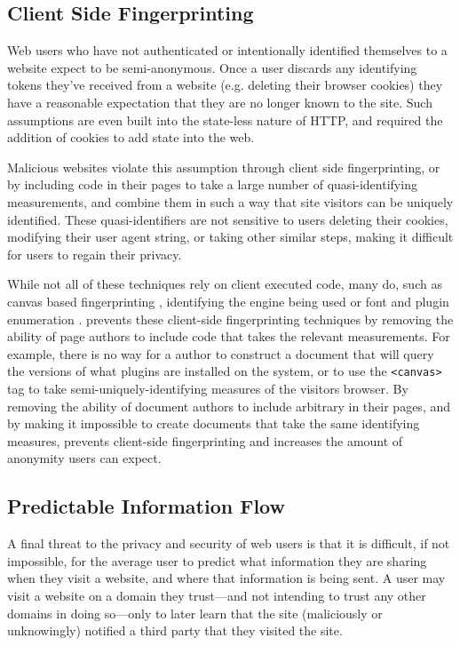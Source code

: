 \subsection{Client Side Fingerprinting}
Web users who have not authenticated or intentionally identified themselves to
a website expect to be semi-anonymous.  Once a user discards any identifying
tokens they've received from a website (e.g. deleting their browser cookies)
they have a reasonable expectation that they are no longer known to the site.
Such assumptions are even built into the state-less nature of HTTP, and
required the addition of cookies to add state into the web.

Malicious websites violate this assumption through client side
fingerprinting, or by including \JS code in their pages to
take a large number of quasi-identifying measurements, and combine them
in such a way that site visitors can be uniquely identified.  These
quasi-identifiers are not sensitive to users deleting their cookies,
modifying their user agent string, or taking other similar steps, making it
difficult for users to regain their privacy.

While not all of these techniques rely on client executed \JS
code, many do, such as canvas based fingerprinting
\cite{mowery2012pixel,acar2014web}, identifying the \JS
engine being used\cite{mowery2011fingerprinting} or font and plugin enumeration
\cite{eckersley2010unique}.  \CDF prevents these client-side fingerprinting
techniques by removing the ability of page authors to
include code that takes the relevant measurements.  For
example, there is no way for a \CDF author to construct a \CDF document that
will query the versions of what plugins are installed on the system, or to
use the \texttt{<canvas>} tag to take semi-uniquely-identifying measures of the
visitors browser.  By removing the ability of document authors to include
arbitrary \JS in their pages, and by making it impossible to create
documents that take the same identifying measures, \CDF prevents client-side
fingerprinting and increases the amount of anonymity users can expect.


\subsection{Predictable Information Flow}
\label{sec:eval-info-flow}
A final threat to the privacy and security of web users is that it is difficult,
if not impossible, for the average user to predict what information they are
sharing when they visit a website, and where that information is being sent.
A user may visit a website on a domain they trust---and not intending to trust
any other domains in doing so---only to later learn that the site (maliciously
or unknowingly) notified a third party that they visited the site.

